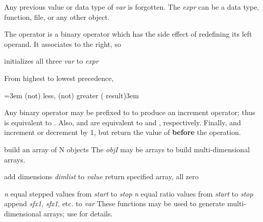 Any previous value or data type of {\it var} is forgotten.
The {\it expr\/} can be a data type, function, file, or any other object.

The \kbd{=} operator is a binary operator which has the side effect of
redefining its left operand.  It associates to the right, so

       {initializes all three {\it var\/} to {\it expr}}


From highest to lowest precedence,

\keyindent=3em
\func{>= < <= >}
     {(not) less, (not) greater ( result)\hglue3em}
\endindentedkeys

Any binary operator may be prefixed to \kbd{=} to produce an increment
operator; thus  is equivalent to .  Also, 
and  are equivalent to  and , respectively.
Finally,  and  increment or decrement  by 1, but
return the value of  {\bf before} the operation.


       {build an array of N objects}
The {\it objI} may be arrays to build multi-dimensional arrays.

       {add dimensions {\it dimlist\/} to {\it value}}
       {return specified array, all zero}

       {{\it n} equal stepped values from {\it start\/} to {\it stop}}
       {{\it n} equal ratio values from {\it start\/} to {\it stop}}
       {append {\it sfx1}, {\it sfx1}, etc. to {\it var}}
These functions may be used to generate multi-dimensional arrays;
 use  for details.

